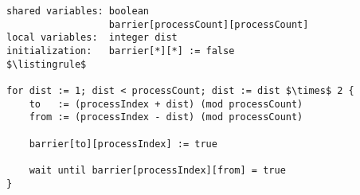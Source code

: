\begin{lstlisting}[mathescape]
shared variables: boolean
                  barrier[processCount][processCount]
local variables:  integer dist
initialization:   barrier[*][*] := false
$\listingrule$

for dist := 1; dist < processCount; dist := dist $\times$ 2 {
	to   := (processIndex + dist) (mod processCount)
	from := (processIndex - dist) (mod processCount)
	
	barrier[to][processIndex] := true
	
	wait until barrier[processIndex][from] = true
}
\end{lstlisting}

